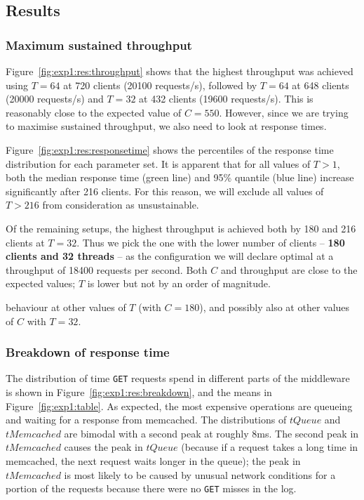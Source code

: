 \documentclass[11pt]{article}
\newcommand{\get}[0]{\texttt{GET}}
\newcommand{\todo}[1]{\fcolorbox{black}{Apricot}{TODO: #1}}
\begin{document}
\subsection{Results}

\subsubsection{Maximum sustained throughput}
Figure~\ref{fig:exp1:res:throughput} shows that the highest throughput was achieved using $T=64$ at 720 clients (20100 requests/s), followed by $T=64$ at 648 clients (20000 requests/s) and $T=32$ at 432 clients (19600 requests/s). This is reasonably close to the expected value of $C=550$. However, since we are trying to maximise sustained throughput, we also need to look at response times.

Figure~\ref{fig:exp1:res:responsetime} shows the percentiles of the response time distribution for each parameter set. It is apparent that for all values of $T > 1$, both the median response time (green line) and 95\% quantile (blue line) increase significantly after 216 clients. For this reason, we will exclude all values of $T > 216$ from consideration as unsustainable.

Of the remaining setups, the highest throughput is achieved both by 180 and 216 clients at $T=32$. Thus we pick the one with the lower number of clients -- \textbf{180 clients and 32 threads} -- as the configuration we will declare optimal at a throughput of 18400 requests per second. Both $C$ and throughput are close to the expected values; $T$ is lower but not by an order of magnitude.

\todo{Investigate and explain} behaviour at other values of $T$ (with $C=180$), and possibly also at other values of $C$ with $T=32$.

\subsubsection{Breakdown of response time} The distribution of time \get{} requests spend in different parts of the middleware is shown in Figure~\ref{fig:exp1:res:breakdown}, and the means in Figure~\ref{fig:exp1:table}. As expected, the most expensive operations are queueing and waiting for a response from memcached. The distributions of $tQueue$ and $tMemcached$ are bimodal with a second peak at roughly 8ms. The second peak in $tMemcached$ causes the peak in $tQueue$ (because if a request takes a long time in memcached, the next request waits longer in the queue); the peak in $tMemcached$ is most likely to be caused by unusual network conditions for a portion of the requests because there were no \get{} misses in the log.
\end{document}
